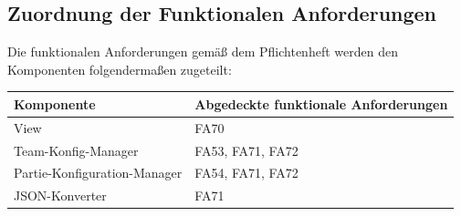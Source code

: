\subsection{Zuordnung der Funktionalen Anforderungen}

Die funktionalen Anforderungen gemäß dem Pflichtenheft werden den Komponenten folgendermaßen zugeteilt:

\begin{table}[h]
    \centering
    \begin{tabular}{|l|l|}
        \hline
        \textbf{Komponente} & \textbf{Abgedeckte funktionale Anforderungen}\\ \hline 
        
        View & FA70   \\ \hline     
        
        Team-Konfig-Manager & FA53, FA71, FA72 \\ \hline

        Partie-Konfiguration-Manager & FA54, FA71, FA72 \\ \hline

        JSON-Konverter & FA71 \\ \hline


    \end{tabular}
\end{table}
